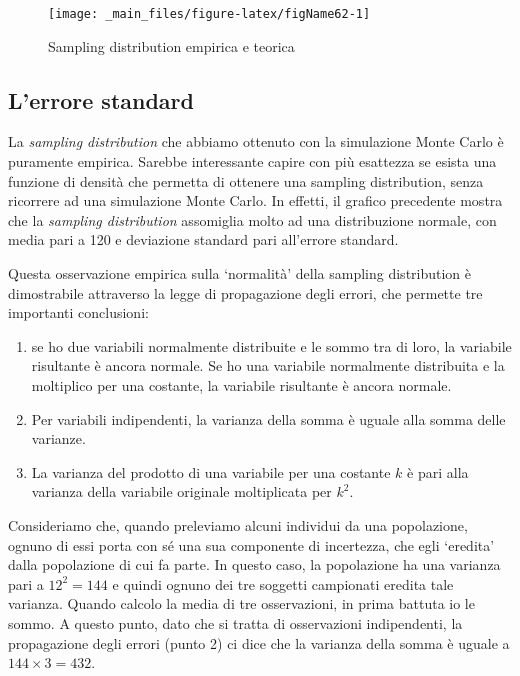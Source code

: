 \documentclass[a4paper,12pt,oneside]{book}
\providecommand{\tightlist}{%
  \setlength{\itemsep}{0pt}\setlength{\parskip}{0pt}}
\begin{document}
\begin{figure}

{\centering \texttt{[image: \_main\_files/figure-latex/figName62-1]} 

}

\caption{Sampling distribution empirica e teorica}\label{fig:figName62}
\end{figure}

\hypertarget{lerrore-standard}{%
\subsection{L'errore standard}\label{lerrore-standard}}

La \emph{sampling distribution} che abbiamo ottenuto con la simulazione Monte Carlo è puramente empirica. Sarebbe interessante capire con più esattezza se esista una funzione di densità che permetta di ottenere una sampling distribution, senza ricorrere ad una simulazione Monte Carlo. In effetti, il grafico precedente mostra che la \emph{sampling distribution} assomiglia molto ad una distribuzione normale, con media pari a 120 e deviazione standard pari all'errore standard.

Questa osservazione empirica sulla `normalità' della sampling distribution è dimostrabile attraverso la legge di propagazione degli errori, che permette tre importanti conclusioni:

\begin{enumerate}
\def\labelenumi{\arabic{enumi}.}
\tightlist
\item
  se ho due variabili normalmente distribuite e le sommo tra di loro, la variabile risultante è ancora normale. Se ho una variabile normalmente distribuita e la moltiplico per una costante, la variabile risultante è ancora normale.
\item
  Per variabili indipendenti, la varianza della somma è uguale alla somma delle varianze.
\item
  La varianza del prodotto di una variabile per una costante \(k\) è pari alla varianza della variabile originale moltiplicata per \(k^2\).
\end{enumerate}

Consideriamo che, quando preleviamo alcuni individui da una popolazione, ognuno di essi porta con sé una sua componente di incertezza, che egli `eredita' dalla popolazione di cui fa parte. In questo caso, la popolazione ha una varianza pari a \(12^2 = 144\) e quindi ognuno dei tre soggetti campionati eredita tale varianza. Quando calcolo la media di tre osservazioni, in prima battuta io le sommo. A questo punto, dato che si tratta di osservazioni indipendenti, la propagazione degli errori (punto 2) ci dice che la varianza della somma è uguale a \(144 \times 3 = 432\).
\end{document}
